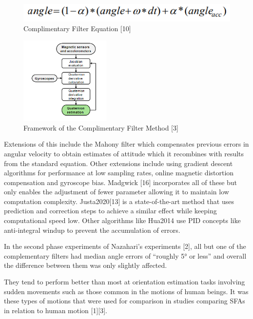 \documentclass[10pt]{report}
\begin{document}
\begin{figure}[!h]
  \caption{Complimentary Filter Equation [10]}
  \centering
  \label{fig:cf_equat}
  \includegraphics[width=1\textwidth]{cf_equat.PNG}
\end{figure}


\begin{figure}[!h]
  \caption{Framework of the Complimentary Filter Method [3]}
  \centering
  \label{fig:cfs}
  \includegraphics[width=0.4\textwidth]{cf.PNG}
\end{figure}

Extensions of this include the Mahony filter which compensates previous errors in angular velocity to obtain estimates of attitude which it recombines with results from the standard equation. Other extensions include using gradient descent algorithms for performance at low sampling rates, online magnetic distortion compensation and gyroscope bias. Madgwick [16] incorporates all of these but only enables the adjustment of fewer parameter allowing it to maintain low computation complexity. Justa2020[13] is a state-of-the-art method that uses prediction and correction steps to achieve a similar effect while keeping computational speed low. Other algorithms like Hua2014 use PID concepts like anti-integral windup to prevent the accumulation of errors.

In the second phase experiments of Nazahari's experiments [2], all but one of the complementary filters had median angle errors of “roughly 5° or less” and overall the difference between them was only slightly affected.

They tend to perform better than most at orientation estimation tasks involving sudden movements such as those common in the motions of human beings. It was these types of motions that were used for comparison in studies comparing SFAs in relation to human motion [1][3].
\end{document}
